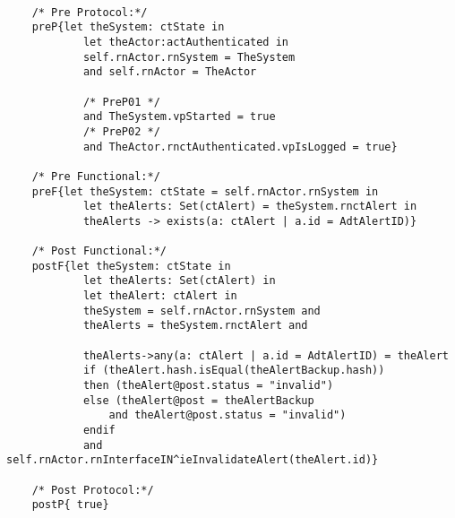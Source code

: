 	\scriptsize
	\vspace{0.5cm}
	\begin{lstlisting}[style=MessirStyle,firstnumber=auto,captionpos=b,caption={\msrmessir (MCL-oriented) specification of the operation \emph{oeInvalidateAlert}.},label=OM-actCoordinator-oeInvalidateAlert-MCL-LST]

	/* Pre Protocol:*/ 
	preP{let theSystem: ctState in
	  		let theActor:actAuthenticated in
	  		self.rnActor.rnSystem = TheSystem
	  		and self.rnActor = TheActor
	  
			/* PreP01 */
	  		and TheSystem.vpStarted = true
			/* PreP02 */
	  		and TheActor.rnctAuthenticated.vpIsLogged = true}
	
	/* Pre Functional:*/
	preF{let theSystem: ctState = self.rnActor.rnSystem in
	  		let theAlerts: Set(ctAlert) = theSystem.rnctAlert in
	  		theAlerts -> exists(a: ctAlert | a.id = AdtAlertID)}
	
	/* Post Functional:*/ 
	postF{let theSystem: ctState in
	  		let theAlerts: Set(ctAlert) in
	  		let theAlert: ctAlert in
	  		theSystem = self.rnActor.rnSystem and
	  		theAlerts = theSystem.rnctAlert and
	  		
	  		theAlerts->any(a: ctAlert | a.id = AdtAlertID) = theAlert
	  		if (theAlert.hash.isEqual(theAlertBackup.hash))
	  		then (theAlert@post.status = "invalid")
	  		else (theAlert@post = theAlertBackup
	  			and theAlert@post.status = "invalid")
	  		endif
	  		and self.rnActor.rnInterfaceIN^ieInvalidateAlert(theAlert.id)}
	
	/* Post Protocol:*/ 
	postP{ true}
	
	\end{lstlisting}
	\normalsize 
	
	
	
	





